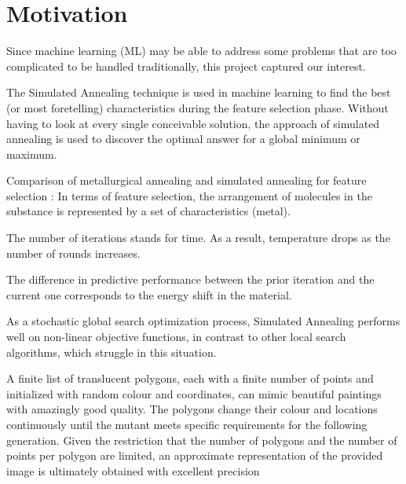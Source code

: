 
\chapter{Motivation}
\label{Motivation}
{Since machine learning (ML) may be able to address some problems that are too complicated to be handled traditionally, this project captured our interest.

The Simulated Annealing technique is used in machine learning to find the best (or most foretelling) characteristics during the feature selection phase. Without having to look at every single conceivable solution, the approach of simulated annealing is used to discover the optimal answer for a global minimum or maximum.

Comparison of metallurgical annealing and simulated annealing 
for feature selection : In terms of feature selection, the arrangement of molecules in the substance is represented by a set of characteristics (metal).

The number of iterations stands for time. As a result, temperature drops as the number of rounds increases.

The difference in predictive performance between the prior iteration and the current one corresponds to the energy shift in the material.

As a stochastic global search optimization process, Simulated Annealing performs well on non-linear objective functions, in contrast to other local search algorithms, which struggle in this situation.

A finite list of translucent polygons, each with a finite number of points and initialized with random colour and coordinates, can mimic beautiful paintings with amazingly good quality. The polygons change their colour and locations continuously until the mutant meets specific requirements for the following generation. Given the restriction that the number of polygons and the number of points per polygon are limited,
an approximate representation of the provided image is ultimately obtained with excellent precision}



